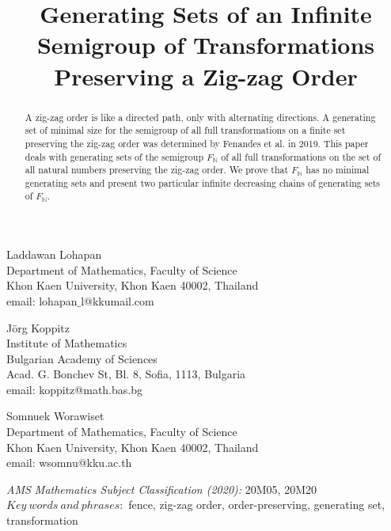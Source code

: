\documentclass[11pt]{article}
\date{}
\title{\bf Generating Sets of an Infinite Semigroup of Transformations Preserving a Zig-zag Order }\vspace{.25 in}
\theoremstyle{plain}
\theoremstyle{definition}
\begin{document}
\maketitle

\begin{center}
Laddawan Lohapan\\
Department of Mathematics, Faculty of Science\\
Khon Kaen University, Khon Kaen 40002, Thailand\\
email: lohapan$\_$l@kkumail.com
\end{center}
\begin{center}
J\"org Koppitz\\
Institute of Mathematics\\
Bulgarian Academy of Sciences\\
Acad. G. Bonchev St, Bl. 8, Sofia, 1113, Bulgaria\\
email: koppitz@math.bas.bg
\end{center}
\begin{center}
Somnuek Worawiset\\
Department of Mathematics, Faculty of Science\\
Khon Kaen University, Khon Kaen 40002, Thailand\\
email: wsomnu@kku.ac.th 
\end{center}



\begin{abstract}
A zig-zag order is like a directed path, only with alternating directions. A generating set of minimal size for the semigroup of all full transformations on a finite set preserving the zig-zag order was determined by Fenandes et al. in 2019. This paper deals with generating sets of the semigroup $F_{\mathbb{N}}$ of all full transformations on the set of all natural numbers preserving the zig-zag order. We prove that $F_{\mathbb{N}}$ has no minimal generating sets and present two particular infinite decreasing chains of generating sets of $F_{\mathbb{N}}.$
\end{abstract}
\textit{AMS Mathematics Subject Classification (2020):} 20M05, 20M20\\
$Key~words~and~phrases:$ fence, zig-zag order, order-preserving, generating set, transformation
\end{document}
